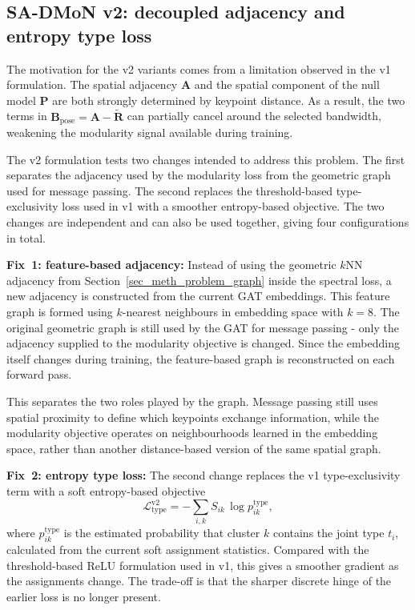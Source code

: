 \subsection{SA-DMoN v2: decoupled adjacency and entropy type loss}
\label{sec_meth_sadmon_v2}

The motivation for the v2 variants comes from a limitation observed in
the v1 formulation.
The spatial adjacency $\mathbf{A}$ and the spatial
component of the null model $\mathbf{P}$ are both strongly determined
by keypoint distance.
As a result, the two terms in
$\mathbf{B}_{\text{pose}} = \mathbf{A} - \tilde{\mathbf{R}}$ can
partially cancel around the selected bandwidth,
weakening the modularity signal available during training.

The v2 formulation tests two changes intended to address this problem.
The first separates the adjacency used by the modularity loss
from the geometric graph used for message passing.
The second replaces the threshold-based type-exclusivity loss
used in v1 with a smoother entropy-based objective.
The two changes are independent and can also be used together,
giving four configurations in total.

\textbf{Fix~1: feature-based adjacency:}
Instead of using the geometric $k$NN adjacency from
Section~\ref{sec_meth_problem_graph} inside the spectral loss,
a new adjacency is constructed from the current GAT embeddings.
This feature graph is formed using $k$-nearest neighbours
in embedding space with $k=8$.
The original geometric graph is still used by the GAT
for message passing -
only the adjacency supplied to the modularity objective is changed.
Since the embedding itself changes during training,
the feature-based graph is reconstructed on each forward pass.

This separates the two roles played by the graph.
Message passing still uses spatial proximity to define
which keypoints exchange information,
while the modularity objective operates on neighbourhoods
learned in the embedding space,
rather than another distance-based version of the same spatial graph.

\textbf{Fix~2: entropy type loss:}
The second change replaces the v1 type-exclusivity term
with a soft entropy-based objective
\begin{equation}
    \mathcal{L}_{\text{type}}^{\text{v2}}
    =
    -\sum_{i,k}
    S_{ik}\,\log p^{\text{type}}_{ik},
\end{equation}
where $p^{\text{type}}_{ik}$ is the estimated probability
that cluster $k$ contains the joint type $t_i$,
calculated from the current soft assignment statistics.
Compared with the threshold-based ReLU formulation used in v1,
this gives a smoother gradient as the assignments change.
The trade-off is that the sharper discrete hinge
of the earlier loss is no longer present.

